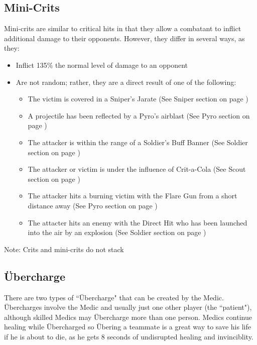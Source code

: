 \subsection{Mini-Crits}
Mini-crits are similar to critical hits in that they allow a combatant to inflict additional damage to their opponents.  However, they differ in several ways, as they:
\begin{itemize}
	\item Inflict 135\% the normal level of damage to an opponent
	\item Are not random; rather, they are a direct result of one of the following:
		\begin{itemize}
			\item The victim is covered in a Sniper's Jarate (See Sniper section on page \pageref{Sniper})
			\item A projectile has been reflected by a Pyro's airblast (See Pyro section on page \pageref{Pyro})
			\item The attacker is within the range of a Soldier's Buff Banner (See Soldier section on page \pageref{Soldier})
			\item The attacker or victim is under the influence of Crit-a-Cola (See Scout section on page \pageref{Scout})
			\item The attacker hits a burning victim with the Flare Gun from a short distance away (See Pyro section on page \pageref{Pyro})
			\item The attacter hits an enemy with the Direct Hit who has been launched into the air by an explosion (See Soldier section on page \pageref{Soldier})
		\end{itemize}
\end{itemize}
Note: Crits and mini-crits do not stack

\newpage

\subsection{Übercharge}
\label{Ubercharge}
There are two types of ``Übercharge" that can be created by the Medic. Übercharges involve the Medic and usually just one other player (the ``patient"), although skilled Medics may Übercharge more than one person.  Medics continue healing while Übercharged so Übering a teammate is a great way to save his life if he is about to die, as he gets 8 seconds of undisrupted healing and invinciblity.

